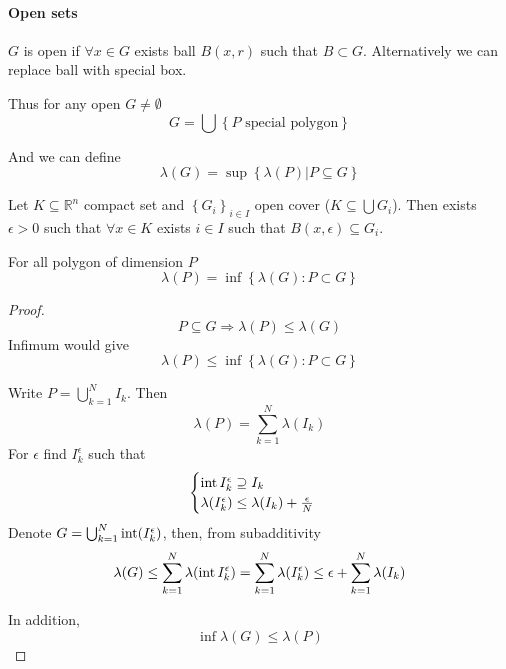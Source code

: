 \paragraph{Open sets}
\begin{definition}
	$G$ is open if $\forall x\in G$ exists ball $B(x,r)$ such that $B\subset G$. Alternatively we can replace ball with special box.
\end{definition}
Thus for any open $G\neq \emptyset$ 
$$G = \bigcup \left\{ P \text{ special polygon}  \right\}$$

And we can define
$$\lambda(G) = \sup \left\{ \lambda(P) | P\subseteq G \right\}$$

\begin{lemma}
	Let $K\subseteq \mathbb{R}^n$ compact set and $\left\{ G_i \right\}_{i\in I}$ open cover ($K\subseteq \bigcup G_i$). Then exists $\epsilon>0$ such that $\forall x\in K$ exists $i\in I$ such that $B(x,\epsilon) \subseteq G_i$.
\end{lemma}
\begin{lemma} \label{lemma_poly_inf}
	For all polygon of dimension $P$ 
	$$\lambda(P) = \inf \left\{ \lambda(G) : P\subset G  \right\}$$
	\begin{proof}
		$$P \subseteq G \Rightarrow \lambda(P) \leq \lambda(G)$$
		Infimum would give
		$$\lambda(P) \leq \inf \left\{ \lambda(G) : P\subset G  \right\}$$
		
		
		Write $P = \bigcup_{k=1}^N I_k$. Then
		$$\lambda(P)  =\sum_{k=1}^N \lambda(I_k)$$
		For $\epsilon$ find $I_k^\epsilon$ such that
		$$\begin{cases}
		\operatorname{int} I_k^\epsilon \supseteq I_k\\
		\lambda(I_k^\epsilon) \leq \lambda(I_k) + \frac{\epsilon}{N}
		\end{cases}$$
		Denote $G = \bigcup_{k=1}^N \operatorname{int} (I_k^\epsilon)$, then, from subadditivity
		$$\lambda(G) \leq \sum_{k=1}^N \lambda (\operatorname{int} I_k^\epsilon) = \sum_{k=1}^N \lambda (I_k^\epsilon) \leq \epsilon + \sum_{k=1}^N \lambda(I_k) $$
		
		In addition,
		$$\inf \lambda(G) \leq \lambda(P) $$
	\end{proof}
\end{lemma}

